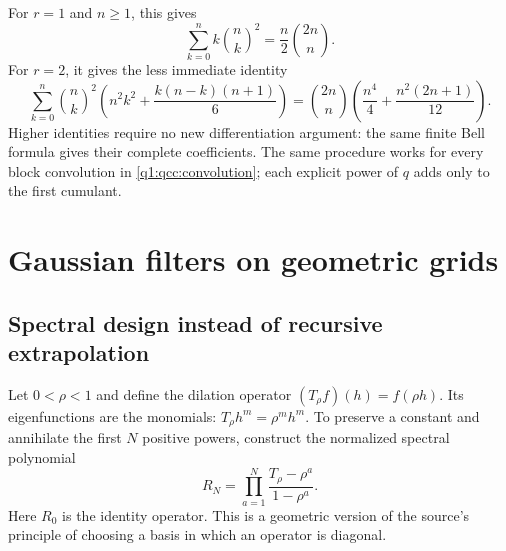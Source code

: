 \documentclass[11pt,a4paper,oneside,openany]{book}
\theoremstyle{definition}
\theoremstyle{remark}
\begin{document}
For \(r=1\) and \(n\ge1\), this gives
\[
 \sum_{k=0}^{n} k\binom nk^2=\frac n2\binom{2n}{n}.
\]
For \(r=2\), it gives the less immediate identity
\[
 \sum_{k=0}^{n}\binom nk^2
    \left(n^2k^2+\frac{k(n-k)(n+1)}6\right)
 =\binom{2n}{n}\left(\frac{n^4}{4}
                      +\frac{n^2(2n+1)}{12}\right).
\]
Higher identities require no new differentiation argument: the same finite Bell
formula gives their complete coefficients. The same procedure works for every
block convolution in \cref{q1:qcc:convolution}; each explicit power of \(q\)
adds only to the first cumulant.
\chapter{Gaussian filters on geometric grids}
\label{q1:qcc:filters}
\section{Spectral design instead of recursive extrapolation}
Let \(0<\rho<1\) and define the dilation operator
\((T_\rho f)(h)=f(\rho h)\). Its eigenfunctions are the monomials:
\(T_\rho h^m=\rho^m h^m\). To preserve a constant and annihilate the
first \(N\) positive powers, construct the normalized spectral polynomial
\begin{equation}\label{q1:qcc:filter-def}
 R_N=\prod_{a=1}^{N}\frac{T_\rho-\rho^a}{1-\rho^a}.
\end{equation}
Here \(R_0\) is the identity operator. This is a geometric version of the
source's principle of choosing a basis in which an operator is diagonal.
\end{document}
